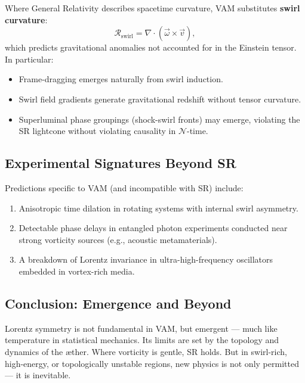 \documentclass[11pt]{article}
\begin{document}
    Where General Relativity describes spacetime curvature, VAM substitutes \textbf{swirl curvature}:
    \[
        \mathcal{R}_{\text{swirl}} = \nabla \cdot (\vec{\omega} \times \vec{v}),
    \]
    which predicts gravitational anomalies not accounted for in the Einstein tensor. In particular:
    \begin{itemize}
        \item Frame-dragging emerges naturally from swirl induction.
        \item Swirl field gradients generate gravitational redshift without tensor curvature.
        \item Superluminal phase groupings (shock-swirl fronts) may emerge, violating the SR lightcone without violating causality in \( \mathcal{N} \)-time.
    \end{itemize}

    \subsection{Experimental Signatures Beyond SR}

    Predictions specific to VAM (and incompatible with SR) include:
    \begin{enumerate}
        \item Anisotropic time dilation in rotating systems with internal swirl asymmetry.
        \item Detectable phase delays in entangled photon experiments conducted near strong vorticity sources (e.g., acoustic metamaterials).
        \item A breakdown of Lorentz invariance in ultra-high-frequency oscillators embedded in vortex-rich media.
    \end{enumerate}

    \subsection{Conclusion: Emergence and Beyond}

    Lorentz symmetry is not fundamental in VAM, but emergent — much like temperature in statistical mechanics. Its limits are set by the topology and dynamics of the æther. Where vorticity is gentle, SR holds. But in swirl-rich, high-energy, or topologically unstable regions, new physics is not only permitted — it is inevitable.



    \ifdefined\standalonechapter\else
    
    
\end{document}
